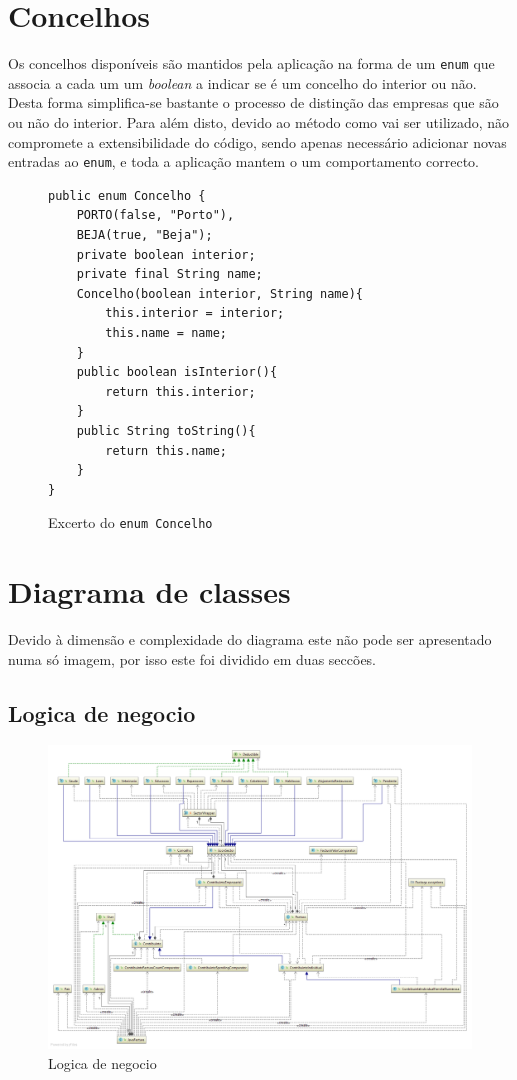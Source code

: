 \documentclass[12pt,a4paper]{report}
\begin{document}
\section{Concelhos}
\label{sec:concelho}
    Os concelhos disponíveis são mantidos pela aplicação na forma de um
    \texttt{enum} que associa a cada um um \textit{boolean} a indicar se
    é um concelho do interior ou não. Desta forma simplifica-se bastante o processo
    de distinção das empresas que são ou não do interior. Para além disto, devido
    ao método como vai ser utilizado, não compromete a extensibilidade do código,
    sendo apenas necessário adicionar novas entradas ao \texttt{enum}, e
    toda a aplicação mantem o um comportamento correcto.

    \begin{figure}[h]
        \begin{verbatim}
public enum Concelho {
    PORTO(false, "Porto"),
    BEJA(true, "Beja");
    private boolean interior;
    private final String name;
    Concelho(boolean interior, String name){
        this.interior = interior;
        this.name = name;
    }
    public boolean isInterior(){
        return this.interior;
    }
    public String toString(){
        return this.name;
    }
}
        \end{verbatim}
        \caption{Excerto do \texttt{enum Concelho}}
        \label{fig:concelhos}
    \end{figure}

\section{Diagrama de classes}
    Devido à dimensão e complexidade do diagrama este não pode ser apresentado numa só imagem,
    por isso este foi dividido em duas seccões.
    \subsection{Logica de negocio}
    \begin{figure}[H]
        \centering
        \includegraphics[width=\textwidth]{./images/businessFull.png}
        \caption{Logica de negocio}
    \end{figure}
\end{document}
